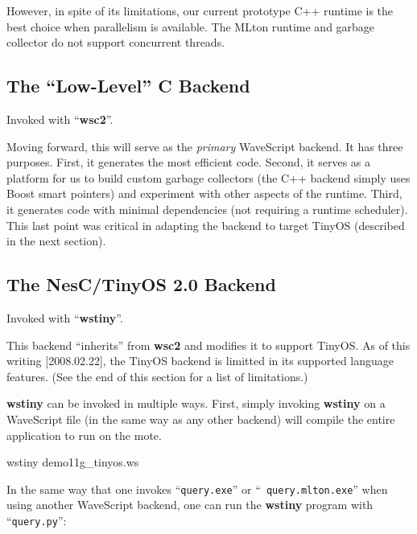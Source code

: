 \documentclass[twocolumn]{report}
\begin{document}

However, in spite of its limitations, our current prototype C++
runtime is the best choice when parallelism is available.  The MLton
runtime and garbage collector do not support concurrent threads.



\subsection{The ``Low-Level'' C Backend}

Invoked with ``{\bf wsc2}''.

Moving forward, this will serve as the {\em primary} WaveScript
backend.  It has three purposes.  First, it generates the most
efficient code.  Second, it serves as a platform for us to build
custom garbage collectors (the C++ backend simply uses Boost smart
pointers) and experiment with other aspects of the runtime.  Third, it
generates code with minimal dependencies (not requiring a runtime
scheduler).  This last point was critical in adapting the backend to
target TinyOS (described in the next section).



\subsection{The NesC/TinyOS 2.0 Backend}

Invoked with ``{\bf wstiny}''.

This backend ``inherits'' from {\bf wsc2} and modifies it to support
TinyOS.  As of this writing [2008.02.22], the TinyOS backend is
limitted in its supported language features.  (See the end of this
section for a list of limitations.)

{\bf wstiny} can be invoked in multiple ways.  First, simply invoking
{\bf wstiny} on a WaveScript file (in the same way as any other backend)
will compile the entire application to run on the mote.

\begin{code}
   wstiny demo11g\_tinyos.ws
\end{code}

In the same way that one invokes ``{\tt query.exe}'' or ``{\tt
  query.mlton.exe}'' when using another WaveScript backend, one can
run the {\bf wstiny} program with ``{\tt query.py}'':
\end{document}
